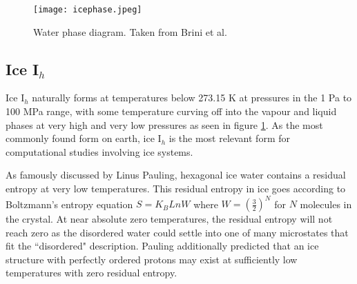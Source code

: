 \begin{figure}
	
	\centering
	
	\texttt{[image: icephase.jpeg]}
	
	\caption{Water phase diagram. Taken from Brini et al. \cite{BriniWaterProperties}}
	
	\label{fig:icePhases}
	
\end{figure}

\subsection{Ice I$_{h}$}

Ice I$_{h}$ naturally forms at temperatures below 273.15 K at pressures in the 1 Pa to 100 MPa range,\cite{IceTPLimits} with some temperature curving off into the vapour and liquid phases at very high and very low pressures as seen in figure \ref{fig:icePhases}.
As the most commonly found form on earth, ice I$_{h}$ is the most relevant form for computational studies involving ice systems.

As famously discussed by Linus Pauling, hexagonal ice water contains a residual entropy at very low temperatures.\cite{PaulingIce} 
This residual entropy in ice goes according to Boltzmann's entropy equation $S=K_{B}LnW$ where $W=(\frac{3}{2})^{N}$ for $N$ molecules in the crystal.
At near absolute zero temperatures, the residual entropy will not reach zero as the disordered water could settle into one of many microstates that fit the ``disordered" description.
Pauling additionally predicted that an ice structure with perfectly ordered protons may exist at sufficiently low temperatures with zero residual entropy.

%
%


